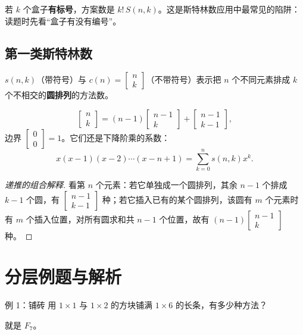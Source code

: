 \begin{tip}
若 $k$ 个盒子\textbf{有标号}，方案数是 $k!\,S(n,k)$。这是斯特林数应用中最常见的陷阱：读题时先看“盒子有没有编号”。
\end{tip}

\subsection{第一类斯特林数}
\begin{definition}[第一类斯特林数]
$s(n,k)$（带符号）与 $c(n)=\begin{bmatrix}n\\k\end{bmatrix}$（不带符号）表示把 $n$ 个不同元素排成 $k$ 个不相交的\textbf{圆排列}的方法数。
\end{definition}
\begin{theorem}[第一类斯特林数的递推]
\[
\begin{bmatrix}n\\k\end{bmatrix}=(n-1)\begin{bmatrix}n-1\\k\end{bmatrix}+\begin{bmatrix}n-1\\k-1\end{bmatrix},
\]
边界 $\begin{bmatrix}0\\0\end{bmatrix}=1$。它们还是下降阶乘的系数：
\[
x(x-1)(x-2)\cdots(x-n+1)=\sum_{k=0}^{n}s(n,k)x^k.
\]
\end{theorem}
\begin{proof}[递推的组合解释]
看第 $n$ 个元素：若它单独成一个圆排列，其余 $n-1$ 个排成 $k-1$ 个圆，有 $\begin{bmatrix}n-1\\k-1\end{bmatrix}$ 种；若它插入已有的某个圆排列，该圆有 $m$ 个元素时有 $m$ 个插入位置，对所有圆求和共 $n-1$ 个位置，故有 $(n-1)\begin{bmatrix}n-1\\k\end{bmatrix}$ 种。
\end{proof}

\section{分层例题与解析}
\begin{problem}{例 1：铺砖}
用 $1\times1$ 与 $1\times2$ 的方块铺满 $1\times6$ 的长条，有多少种方法？
\end{problem}
\hint 就是 $F_7$。

